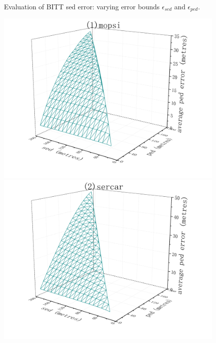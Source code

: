 {\begin{figure}[tb!]
	\caption{\small Evaluation of BITT sed error: varying error bounds $\epsilon_{sed}$ and $\epsilon_{ped}$.}
	\label{fig:bitt-sed-error}
\end{figure}



\begin{figure}[tb!]
	\centering
	\includegraphics[scale = 0.210]{figures/Fig-BITT-mopsi-ped-error.png}\hspace{1ex}
	\includegraphics[scale = 0.210]{figures/Fig-BITT-sercar-ped-error.png}\hspace{1ex}

\end{figure}}
